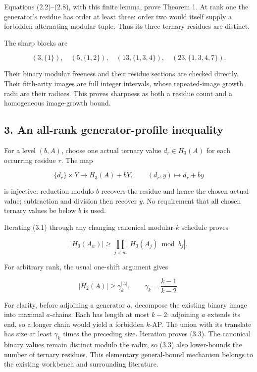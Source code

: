 \documentclass[11pt,a4paper]{article}
\begin{document}
Equations (2.2)--(2.8), with this finite lemma, prove Theorem 1. At rank one the generator's residue has order at least three: order two would itself supply a forbidden alternating modular tuple. Thus its three ternary residues are distinct.

The sharp blocks are

\[
(3,\{1\}),\quad(5,\{1,2\}),\quad
(13,\{1,3,4\}),\quad(23,\{1,3,4,7\}).
\tag{2.9}
\]

Their binary modular freeness and their residue sections are checked directly. Their fifth-arity images are full integer intervals, whose repeated-image growth radii are their radices. This proves sharpness as both a residue count and a homogeneous image-growth bound.

\subsection{3. An all-rank generator-profile inequality}\label{eporig:an-all-rank-generator-profile-inequality}

For a level \((b,A)\), choose one actual ternary value \(d_r\in H_3(A)\) for each occurring residue \(r\). The map

\[
\{d_r\}\times Y\longrightarrow H_3(A)+bY,
\qquad(d_r,y)\longmapsto d_r+by
\tag{3.1}
\]

is injective: reduction modulo \(b\) recovers the residue and hence the chosen actual value; subtraction and division then recover \(y\). No requirement that all chosen ternary values be below \(b\) is used.

Iterating (3.1) through any changing canonical modular-\(k\) schedule proves

\[
|H_3(A_w)|\ge\prod_{j<m}|H_3(A_j)\bmod b_j|.
\tag{3.2}
\]

For arbitrary rank, the usual one-shift argument gives

\[
|H_2(A)|\ge\gamma_k^{|A|},\qquad
\gamma_k=\frac{k-1}{k-2}.
\tag{3.3}
\]

For clarity, before adjoining a generator \(a\), decompose the existing binary image into maximal \(a\)-chains. Each has length at most \(k-2\): adjoining \(a\) extends its end, so a longer chain would yield a forbidden \(k\)-AP. The union with its translate has size at least \(\gamma_k\) times the preceding size. Iteration proves (3.3). The canonical binary values remain distinct modulo the radix, so (3.3) also lower-bounds the number of ternary residues. This elementary general-bound mechanism belongs to the existing workbench and surrounding literature.
\end{document}
